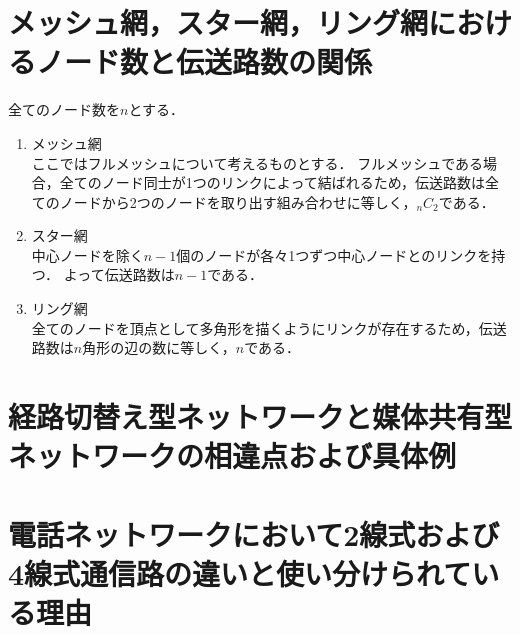 \documentclass[10.5pt]{jsarticle}
\begin{document}
\section{メッシュ網，スター網，リング網におけるノード数と伝送路数の関係}
全てのノード数を$n$とする．
\begin{enumerate}
\item{メッシュ網}\\
ここではフルメッシュについて考えるものとする．
フルメッシュである場合，全てのノード同士が1つのリンクによって結ばれるため，伝送路数は全てのノードから2つのノードを取り出す組み合わせに等しく，\underline{${}_nC_2$}である．
\item{スター網}\\
中心ノードを除く$n-1$個のノードが各々1つずつ中心ノードとのリンクを持つ．
よって伝送路数は\underline{$n-1$}である．
\item{リング網}\\
全てのノードを頂点として多角形を描くようにリンクが存在するため，伝送路数は$n$角形の辺の数に等しく，\underline{$n$}である．
\end{enumerate}

\section{経路切替え型ネットワークと媒体共有型ネットワークの相違点および具体例}


\section{電話ネットワークにおいて2線式および4線式通信路の違いと使い分けられている理由}
\section{}
\section{}
\section{}
\section{}
\section{}
\section{}
\end{document}

